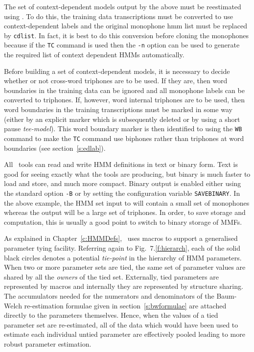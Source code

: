 The set of context-dependent models output by the above must be reestimated using
.  To do this, the training data transcriptions must be converted
to use context-dependent labels and the original monophone hmm list must be
replaced by \texttt{cdlist}.  In fact, it is best to do this conversion before
cloning the monophones because if the  \texttt{TC} 
command 
is used then the \texttt{-n} option
can be used to generate the required list of context dependent HMMs automatically. 

Before building a set of context-dependent models,
it is necessary to decide whether or not cross-word 
triphones are
to be used.  If they are, then word boundaries in the training data can be ignored and
all monophone labels can be converted to triphones.  If, however, word internal triphones
are to be used, then word boundaries in the training transcriptions must be marked in
some way (either by an explicit marker which is subsequently deleted or by using a short
pause \textit{tee-model}).  This word boundary marker is then identified to 
using the \texttt{WB} command to make the \texttt{TC} command use biphones rather
than triphones at word boundaries (see
section~\ref{s:edlab}).

All \HTK\ tools can read and write
HMM definitions in text or binary form.  Text is good for seeing exactly
what the tools are producing, but binary is much faster to load and store, and
much more compact.  Binary output is enabled either using the standard option
\texttt{-B} or by setting the configuration variable 
\texttt{SAVEBINARY}.
In the above example, the HMM set input to  will contain a small
set of monophones whereas the output will be a large set of triphones.
In order, to save storage and computation, this is usually a good point to
switch to binary storage of MMFs. 


As explained in Chapter~\ref{c:HMMDefs}, \HTK\ uses macros to support a 
generalised parameter tying facility.  Referring again to
Fig.~7.\ref{f:hierarch}, each of the solid black circles denotes a potential
{\em tie-point} in the hierarchy of HMM parameters.  When two or more
parameter sets are tied, the same set of parameter values are shared by all
the {\em owners} of the tied set.  Externally, tied parameters are
represented by macros and internally they are represented by structure 
sharing.  The accumulators needed for  the numerators and denominators of
the Baum-Welch re-estimation formulae  given in section~\ref{s:bwformulae}
are attached directly to  the parameters themselves. Hence,  when the values
of a tied parameter set are re-estimated, all of the data which would have
been used to  estimate each individual untied parameter are effectively
pooled leading to more robust parameter estimation.

